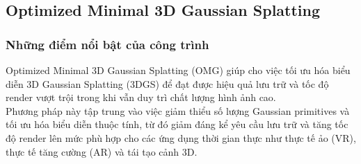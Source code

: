 \subsection{Optimized Minimal 3D Gaussian Splatting \cite{b6}}
\subsubsection{Những điểm nổi bật của công trình}
Optimized Minimal 3D Gaussian Splatting (OMG) giúp cho việc tối ưu hóa biểu diễn 3D Gaussian Splatting (3DGS) để đạt được hiệu quả lưu trữ và tốc độ render vượt trội trong khi vẫn duy trì chất lượng hình ảnh cao. \\

Phương pháp này tập trung vào việc giảm thiểu số lượng Gaussian primitives và tối ưu hóa biểu diễn thuộc tính, từ đó giảm đáng kể yêu cầu lưu trữ và tăng tốc độ render lên mức phù hợp cho các ứng dụng thời gian thực như thực tế ảo (VR), thực tế tăng cường (AR) và tái tạo cảnh 3D.

